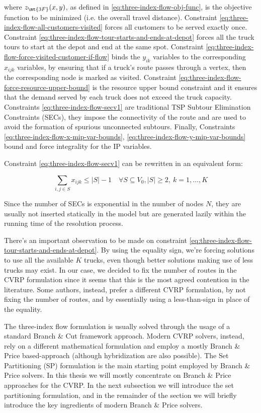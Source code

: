 where $z_\mt{3F}(x, y)$, as defined in \eqref{eq:three-index-flow-obj-func}, is the objective function to be minimized (i.e. the overall travel distance).
Constraint \eqref{eq:three-index-flow-all-customers-visited} forces all customers to be served exactly once.
Constraint \eqref{eq:three-index-flow-tour-starts-and-ends-at-depot} forces all the truck tours to start at the depot and end at the same spot.
Constraint \eqref{eq:three-index-flow-force-visited-customer-if-flow} binds the $y_{ik}$ variables to the corresponding $x_{ijk}$ variables, by ensuring that if a truck's route passes through a vertex, then the corresponding node is marked as visited.
Constraint \eqref{eq:three-index-flow-force-resource-upper-bound} is the resource upper bound constraint and it ensures that the demand served by each truck does not exceed the truck capacity.
Constraints \eqref{eq:three-index-flow-secv1} are traditional TSP Subtour Elimination Constraints (SECs), they impose the connectivity of the route and are used to avoid the formation of spurious unconnected subtours.
Finally, Constraints \eqref{eq:three-index-flow-x-mip-var-bounds}, \eqref{eq:three-index-flow-y-mip-var-bounds} bound and force integrality for the IP variables.


Constraint \eqref{eq:three-index-flow-secv1} can be rewritten in an equivalent form:

\begin{equation}\label{eq:three-index-flow-secv2}
	\sum_{i, j \in S} x_{ijk} \le |S| - 1 \quad \forall S \subseteq V_0, |S| \ge 2,\ k = 1, \dots, K
\end{equation}

Since the number of SECs is exponential in the number of nodes $N$, they are usually not inserted statically in the model but are generated lazily within the running time of the resolution process.

There's an important observation to be made on constraint \eqref{eq:three-index-flow-tour-starts-and-ends-at-depot}.
By using the equality sign, we're forcing solutions to use all the available $K$ trucks, even though better solutions making use of less trucks may exist.
In our case, we decided to fix the number of routes in the CVRP formulation since it seems that this is the most agreed contention in the literature.
Some authors, instead, prefer a different CVRP formulation, by not fixing the number of routes, and by essentially using a less-than-sign in place of the equality.

The three-index flow formulation is usually solved through the usage of a standard Branch \& Cut framework approach.
Modern CVRP solvers, instead, rely on a different mathematical formulation and employ a  mostly Branch \& Price based-approach (although hybridization are also possible).
The Set Partitioning (SP) formulation is the main starting point employed by Branch \& Price solvers.
In this thesis we will mostly concentrate on Branch \& Price approaches for the CVRP.
In the next subsection we will introduce the set partitioning formulation, and in the remainder of the section
we will briefly introduce the key ingredients of modern Branch \& Price solvers.

